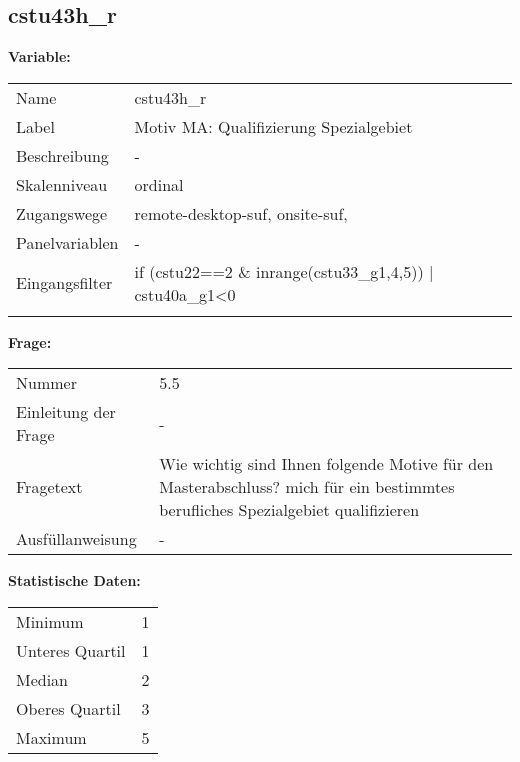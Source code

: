 	
	
	\subsection{cstu43h\_r}
	\label{subSection:cstu43h_r}

	\noindent\textbf{Variable:}\\
		\begin{tabular}{lL{11.3cm}}
			\label{tableVariable:cstu43h_r}
			Name & cstu43h\_r \\
			Label & Motiv MA: Qualifizierung Spezialgebiet \\
			Beschreibung & - \\
			Skalenniveau & ordinal \\
			Zugangswege &
				remote-desktop-suf,
				onsite-suf,
 \\
			Panelvariablen & -
			 \\
			Eingangsfilter & if (cstu22==2 \& inrange(cstu33\_g1,4,5)) | cstu40a\_g1\textless{}0 \\
 \\
		\end{tabular}

		\vspace*{1 cm}
		\noindent\textbf{Frage:}\\
		\begin{tabular}{lL{11.3cm}}
			\label{tableQuestion:cstu43h_r}
			Nummer & 5.5 \\
			Einleitung der Frage & - \\
			Fragetext & Wie wichtig sind Ihnen folgende Motive für den Masterabschluss?
mich für ein bestimmtes berufliches Spezialgebiet qualifizieren \\
			Ausfüllanweisung & - \\
		\end{tabular}


		\vspace*{1 cm}
		\noindent\textbf{Statistische Daten:}\\
			\begin{tabular}{ll}
				\label{tableStatistics:cstu43h_r}
					Minimum & 1 \\
					Unteres Quartil & 1 \\
					Median & 2 \\
					Oberes Quartil & 3 \\
					Maximum & 5 \\
			\end{tabular}



